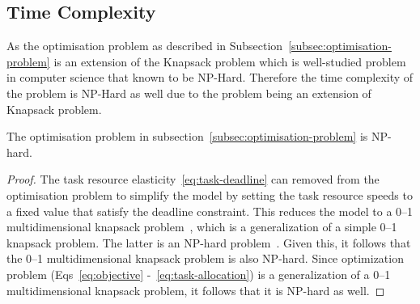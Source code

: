 \subsection{Time Complexity}
\label{subsec:time-complexity}
As the optimisation problem as described in Subsection~\ref{subsec:optimisation-problem} is an extension of the
Knapsack problem which is well-studied problem in computer science that known to be NP-Hard.
Therefore the time complexity of the problem is NP-Hard as well due to the problem being an extension of 
Knapsack problem. 
\begin{theorem}
    The optimisation problem in subsection~\ref{subsec:optimisation-problem} is NP-hard.
\end{theorem}
\begin{proof}
    The task resource elasticity~\ref{eq:task-deadline} can removed from the optimisation problem to simplify the model
    by setting the task resource speeds to a fixed value that satisfy the deadline constraint. This reduces the model
    to a 0--1 multidimensional knapsack problem~\cite{knapsackproblems_2004}, which is a generalization of a
    simple 0--1 knapsack problem. The latter is an NP-hard problem~\cite{knapsackproblems_2004}. Given this, it follows
    that the 0--1 multidimensional knapsack problem is also NP-hard. Since optimization problem
    (Eqs~\ref{eq:objective} -~\ref{eq:task-allocation}) is a generalization of a 0--1 multidimensional knapsack
    problem, it follows that it is NP-hard as well.
\end{proof}

